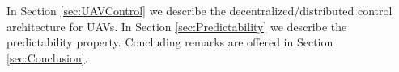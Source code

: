 \documentclass[letterpaper, 10 pt, conference]{ieeeconf}
\newcommand{\card}{\mathrm{card}}
\begin{document}
In Section \ref{sec:UAVControl} we describe the decentralized/distributed control architecture for UAVs. 
In Section \ref{sec:Predictability} we describe the predictability property.
Concluding remarks are offered in Section \ref{sec:Conclusion}.

\end{document}
